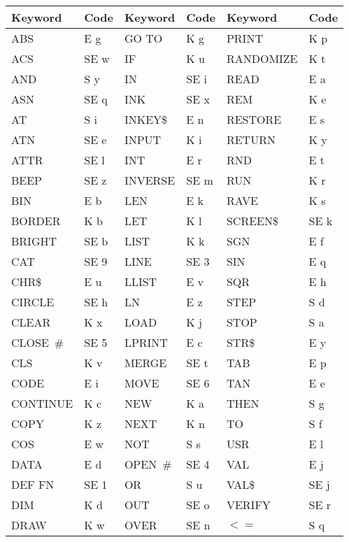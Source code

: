 \begin{tabular}{|ll|ll|ll|}
  \hline
   Keyword & Code & Keyword & Code & Keyword & Code \\
  \hline
  \hline
   ABS      &  E g  & GO TO   &  K g  & PRINT   &  K p  \\
   ACS      &  SE w & IF      &  K u  & RANDOMIZE& K t  \\
   AND      &  S y  & IN      &  SE i & READ    &  E a  \\
   ASN      &  SE q & INK     &  SE x & REM     &  K e  \\
   AT       &  S i  & INKEY\$ &  E n  & RESTORE &  E s  \\
   ATN      &  SE e & INPUT   &  K i  & RETURN  &  K y  \\
   ATTR     &  SE l & INT     &  E r  & RND     &  E t  \\
   BEEP     &  SE z & INVERSE &  SE m & RUN     &  K r  \\
   BIN      &  E b  & LEN     &  E k  & RAVE    &  K s  \\
   BORDER   &  K b  & LET     &  K l  & SCREEN\$&  SE k \\
   BRIGHT   &  SE b & LIST    &  K k  & SGN     &  E f  \\
   CAT      &  SE 9 & LINE    &  SE 3 & SIN     &  E q  \\
   CHR\$    &  E u  & LLIST   &  E v  & SQR     &  E h  \\
   CIRCLE   &  SE h & LN      &  E z  & STEP    &  S d  \\
   CLEAR    &  K x  & LOAD    &  K j  & STOP    &  S a  \\
   CLOSE~\# &  SE 5 & LPRINT  &  E c  & STR\$   &  E y  \\
   CLS      &  K v  & MERGE   &  SE t & TAB     &  E p  \\
   CODE     &  E i  & MOVE    &  SE 6 & TAN     &  E e  \\
   CONTINUE &  K c  & NEW     &  K a  & THEN    &  S g  \\
   COPY     &  K z  & NEXT    &  K n  & TO      &  S f  \\
   COS      &  E w  & NOT     &  S s  & USR     &  E l  \\
   DATA     &  E d  & OPEN~\# &  SE 4 & VAL     &  E j  \\
   DEF FN   &  SE 1 & OR      &  S u  & VAL\$   &  SE j \\
   DIM      &  K d  & OUT     &  SE o & VERIFY  &  SE r \\
   DRAW     &  K w  & OVER    &  SE n & $<=$    &  S q  \\

\end{tabular}

